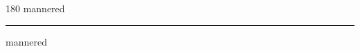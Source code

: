 
\begin{frame}
\begin{center}
\begin{turn}{180}
{\fontsize{2.5cm}{1em}\selectfont mannered}
\end{turn}
\vspace{1em}\par  
\hrule
\vspace{1em}\par  
{\fontsize{2.5cm}{1em}\selectfont mannered}
\end{center}
\end{frame}
